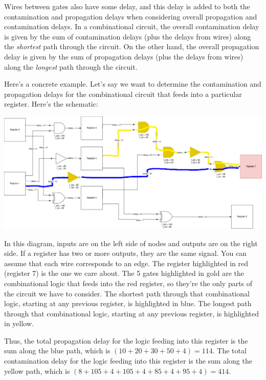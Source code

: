 \documentclass[12pt]{article}
\begin{document}
Wires between gates also have some delay, and this delay is added to both the contamination and propagation delays when considering overall propagation and contamination delays.
In a combinational circuit, the overall contamination delay is given by the sum of contamination delays (plus the delays from wires) along the \textit{shortest} path through the circuit.
On the other hand, the overall propagation delay is given by the sum of propagation delays (plus the delays from wires) along the \textit{longest} path through the circuit.

Here's a concrete example.
Let's say we want to determine the contamination and propagation delays for the combinational circuit that feeds into a particular register.
Here's the schematic:

\begin{centering}
  \includegraphics[width=\linewidth]{schematic}
\end{centering}


In this diagram, inputs are on the left side of nodes and outputs are on the right side. If a register has two or more outputs, they are the same signal. You can assume that each wire corresponds to an edge.
The register highlighted in red (register 7) is the one we care about.
The 5 gates highlighted in gold are the combinational logic that feeds into the red register, so they're the only parts of the circuit we have to consider.
The shortest path through that combinational logic, starting at any previous register, is highlighted in blue.
The longest path through that combinational logic, starting at any previous register, is highlighted in yellow.

Thus, the total propagation delay for the logic feeding into this register is the sum along the blue path, which is $(10 + 20 + 30 + 50 + 4) = 114$.
The total contamination delay for the logic feeding into this register is the sum along the yellow path, which is $(8 + 105 + 4 + 105 + 4 + 85 + 4 + 95 + 4) = 414$.
\end{document}
